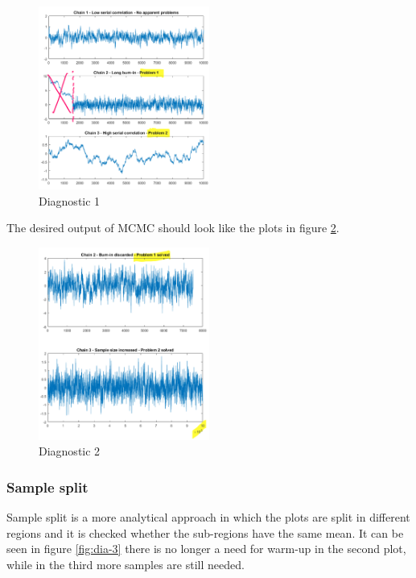   \begin{figure}[H]
    \centering
    \includegraphics[width=0.5\textwidth]{diag_1.png}
    \caption{Diagnostic 1}
    \label{fig:dia-1}
  \end{figure}

  The desired output of MCMC should look like the plots in figure \ref{fig:dia-2}.

  \begin{figure}[H]
    \centering
    \includegraphics[width=0.5\textwidth]{diag_2.png}
    \caption{Diagnostic 2}
    \label{fig:dia-2}
  \end{figure}


    \subsubsection{Sample split}
    Sample split is a more analytical approach in which the plots are split in different regions and it is checked whether the sub-regions have the same mean.
    It can be seen in figure \ref{fig:dia-3} there is no longer a need for warm-up in the second plot, while in the third more samples are still needed.

